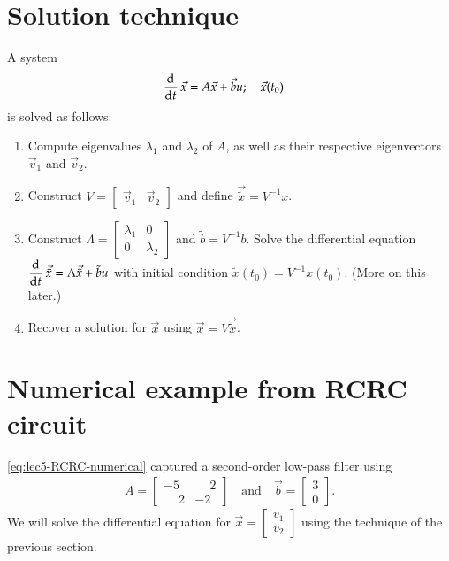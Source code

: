 \section{Solution technique}
A system
\begin{align}
  \dod{}{t} \vec x
  &= A \vec x + \vec b u; \quad \vec x (t_0)
\end{align}
is solved as follows:
\begin{enumerate}
  \item Compute eigenvalues \(\lambda_1\) and \(\lambda_2\) of \(A\), as well as their respective eigenvectors \(\vec v_1\) and \(\vec v_2\).
  \item Construct \(V = \begin{bmatrix}
            \vec v_1 & \vec v_2
        \end{bmatrix}\)
        and define
        \(\vec{\tilde x} = V^{-1} x\).
  \item
  Construct \(\Lambda = \begin{bmatrix}
    \lambda_1 & 0 \\
    0 & \lambda_2
  \end{bmatrix}\) and \(\tilde b = V^{-1} b\).
  Solve the differential equation
  \(\dod{}{t} \vec{\tilde x} = \Lambda \vec{\tilde x} + \tilde b u\)
  with initial condition \(\tilde x(t_0) = V^{-1} x(t_0)\). (More on this later.)
  \item Recover a solution for \(\vec x\) using \(\vec x = V \vec{\tilde x}\).
\end{enumerate}

\section{Numerical example from RCRC circuit}
\autoref{eq:lec5-RCRC-numerical} captured a second-order low-pass filter using
\begin{align}
  A = \begin{bmatrix}
    -5 & \phantom{-}2 \\ \phantom{-}2 & -2
\end{bmatrix} \quad \text{and} \quad
  \vec b = \begin{bmatrix}
    3 \\ 0
\end{bmatrix}.
\end{align}
We will solve the differential equation for \(\vec x = \begin{bmatrix}
  v_1 \\ v_2
\end{bmatrix}\) using the technique of the previous section.


